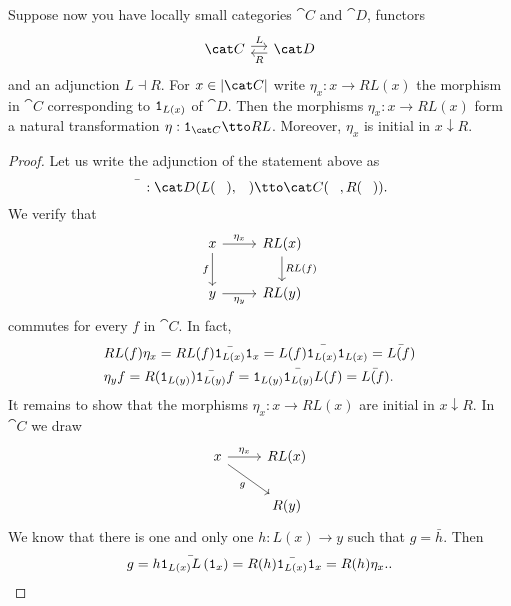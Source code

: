 
\begin{proposition}
Suppose now you have locally small categories \(\cat C\) and \(\cat D\), functors
\[\begin{tikzcd}[column sep=small]
\cat C \ar["L", r, shift left] & \cat D \ar["R", l, shift left]
\end{tikzcd}\]
and an adjunction \(L \dashv R\). For \(x \in \obj{\cat C}\) write \(\eta_x : x \to RL(x)\) the morphism in \(\cat C\) corresponding to \(\mathtt 1_{L(x)}\) of \(\cat D\).
Then the morphisms \(\eta_x : x \to RL(x)\) form a natural transformation \(\eta : \id_{\cat C} \tto RL\). Moreover, \(\eta_x\) is initial in \(x {\downarrow} R\).
\end{proposition}

\begin{proof}
Let us write the adjunction of the statement above as
\[\bar\hole : \cat D (L(\hole), \hole) \tto \cat C (\hole, R(\hole)) .\]
We verify that
\[\begin{tikzcd}
x \ar["{\eta_x}", r] \ar["f", d, swap] & RL(x) \ar["RL(f)", d] \\
y \ar["{\eta_y}", r, swap] & RL(y)
\end{tikzcd}\]
commutes for every \(f\) in \(\cat C\). In fact,
\begin{align*}
& RL(f) \eta_x = RL(f) \bar{\mathtt 1_{L(x)}} \mathtt 1_x = \bar{L(f) \mathtt 1_{L(x)} \mathtt 1_{L(x)}} = \bar{L(f)} \\
& \eta_y f = R(\mathtt 1_{L(y)}) \bar{\mathtt 1_{L(y)}} f = \bar{\mathtt 1_{L(y)} \mathtt 1_{L(y)} L(f)} = \bar{L(f)} .
\end{align*}
It remains to show that the morphisms \(\eta_x : x \to RL(x)\) are initial in \(x {\downarrow} R\). In \(\cat C\) we draw
\[\begin{tikzcd}
x \ar["{\eta_x}", r] \ar["g", dr, swap] & RL(x) \\
& R(y)
\end{tikzcd}\]
We know that there is one and only one \(h : L(x) \to y\) such that \(g = \bar{h}\). Then
\[g = \bar{h \mathtt 1_{L(x)} L\left(\mathtt 1_x\right)} = R(h) \bar{\mathtt 1_{L(x)}} \mathtt 1_{x} = R(h) \eta_x . \qedhere .\]
\end{proof}

